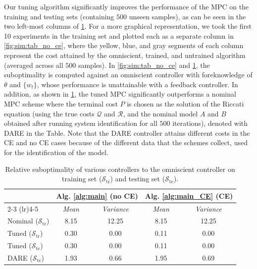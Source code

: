 \documentclass[journal,twoside,web,final]{ieeecolor}
\theoremstyle{definition}
\begin{document}
Our tuning algorithm significantly improves the performance of the MPC on the training and testing sets (containing $500$ unseen samples), as can be seen in the two left-most columns of \cref{tab:sim:random_linear_results}.
For a more graphical representation, we took the first 10 experiments in the training set and plotted each as a separate column in \cref{fig:sim:tab_no_ce}, where the yellow, blue, and gray segments of each column represent the cost attained by the omniscient, trained, and untrained algorithm (averaged across all $500$ samples).
In \cref{fig:sim:tab_no_ce} and \cref{tab:sim:random_linear_results}, the suboptimality is computed against an omniscient controller with foreknowledge of $\theta$ and $\{w_t\}$,
whose performance is unattainable with a feedback controller.
In addition, as shown in \cref{tab:sim:random_linear_results}, the tuned MPC significantly outperforms a nominal MPC scheme where the terminal cost $P$ is chosen as the solution of the Riccati equation (using the true costs $\mathcal{Q}$ and $\mathcal{R}$, and the nominal model $A$ and $B$ obtained after running system identification for all $500$ iterations), denoted with DARE in the Table.
Note that the DARE controller attains different costs in the CE and no CE cases because of the different data that the schemes collect, used for the identification of the model.

\begin{table}
\centering
\caption{Relative suboptimality of various controllers to the omniscient controller on training set ($\mathcal{S}_\text{tr}$) and testing set ($\mathcal{S}_\text{te}$).}\label{tab:sim:random_linear_results}
\begin{tabular}{lcccc}
\toprule
& \multicolumn{2}{c}{\textbf{Alg. \ref{alg:main} (no CE)}} & \multicolumn{2}{c}{\textbf{Alg. \ref{alg:main_CE} (CE)}} \\
\cmidrule(lr){2-3} \cmidrule(lr){4-5}
& \emph{Mean} & \emph{Variance} & \emph{Mean} & \emph{Variance} \\
Nominal ($\mathcal{S}_\text{tr}$)    & 8.15 & 12.25 & 8.15 & 12.25 \\
Tuned ($\mathcal{S}_\text{tr}$)      & 0.30 &  0.00 & 0.11 &  0.00 \\
Tuned ($\mathcal{S}_\text{te}$)      & 0.30 &  0.00 & 0.11 &  0.00 \\
DARE ($\mathcal{S}_\text{te}$)       & 1.93 &  0.66 & 1.95 &  0.69 \\
\bottomrule
\end{tabular}
\end{table}
\end{document}
